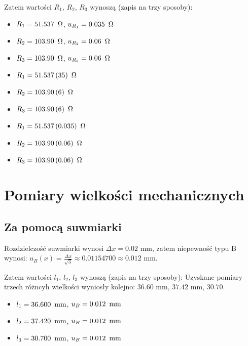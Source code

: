 \documentclass[a4paper]{article}
\begin{document}
Zatem wartości $R_1$, $R_2$, $R_3$ wynoszą (zapis na trzy sposoby):

\begin{itemize}
\item $R_1 = 51.537 \enskip \Omega$, $u_{R_1} = 0.035 \enskip \Omega$
\item $R_2 = 103.90 \enskip \Omega$, $u_{R_2} = 0.06 \enskip \Omega$
\item $R_3 = 103.90 \enskip \Omega$, $u_{R_3} = 0.06 \enskip \Omega$
\end{itemize}

\begin{itemize}
\item $R_1 = 51.537 \, (35) \enskip \Omega$
\item $R_2 = 103.90 \, (6) \enskip \Omega$
\item $R_3 = 103.90 \, (6) \enskip \Omega$
\end{itemize}

\begin{itemize}
\item $R_1 = 51.537 \, (0.035) \enskip \Omega$
\item $R_2 = 103.90 \, (0.06) \enskip \Omega$
\item $R_3 = 103.90 \, (0.06) \enskip \Omega$
\end{itemize}

\section{Pomiary wielkości mechanicznych}

\subsection{Za pomocą suwmiarki}

Rozdzielczość suwmiarki wynosi $\Delta x = 0.02$ mm, zatem niepewność typu B wynosi: $u_B(x) = \frac{\Delta x}{\sqrt{3}} \approx 0.01154700 \approx 0.012$ mm.

Zatem wartości $l_1$, $l_2$, $l_3$ wynoszą (zapis na trzy sposoby):
Uzyskane pomiary trzech różncyh wielkości wyniosły kolejno: $36.60$ mm, $37.42$ mm, $30.70$.

\begin{itemize}
\item $l_1 = 36.600 \enskip \text{mm}$, $u_B = 0.012 \enskip \text{mm}$
\item $l_2 = 37.420 \enskip \text{mm}$, $u_B = 0.012 \enskip \text{mm}$
\item $l_3 = 30.700 \enskip \text{mm}$, $u_B = 0.012 \enskip \text{mm}$
\end{itemize}
\end{document}
